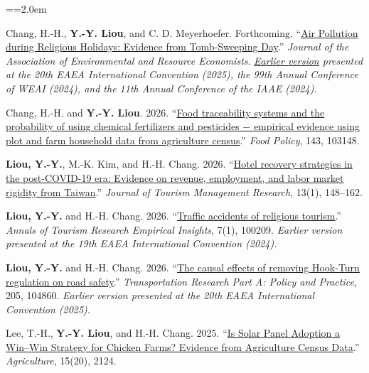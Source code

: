 \documentclass[11pt,letterpaper]{article}
\newenvironment{hanglist}{\par\setlength{\parindent}{0pt}\everypar={\hangindent=2.0em\hangafter=1}}{\par}
\begin{document}
\begin{hanglist}

Chang, H.-H., \textbf{Y.-Y. Liou}, and C. D. Meyerhoefer. Forthcoming. ``\href{https://doi.org/10.1086/743452}{Air Pollution during Religious Holidays: Evidence from Tomb-Sweeping Day}.'' \emph{Journal of the Association of Environmental and Resource Economists}. \newline \textit{\href{https://ssrn.com/abstract=4984614}{Earlier version} presented at the 20th EAEA International Convention (2025), the 99th Annual Conference of WEAI (2024), and the 11th Annual Conference of the IAAE (2024).}

Chang, H.-H. and \textbf{Y.-Y. Liou}. 2026. ``\href{https://doi.org/10.1016/j.foodpol.2026.103148}{Food traceability systems and the probability of using chemical fertilizers and pesticides − empirical evidence using plot and farm household data from agriculture census}.'' \emph{Food Policy}, 143, 103148.

\textbf{Liou, Y.-Y.}, M.-K. Kim, and H.-H. Chang. 2026. ``\href{https://archive.conscientiabeam.com/index.php/31/article/view/4940}{Hotel recovery strategies in the post-COVID-19 era: Evidence on revenue, employment, and labor market rigidity from Taiwan}.'' \emph{Journal of Tourism Management Research}, 13(1), 148--162.

\textbf{Liou, Y.-Y.} and H.-H. Chang. 2026. ``\href{https://doi.org/10.1016/j.annale.2026.100209}{Traffic accidents of religious tourism}.'' \emph{Annals of Tourism Research Empirical Insights}, 7(1), 100209. \newline \textit{Earlier version presented at the 19th EAEA International Convention (2024).}

\textbf{Liou, Y.-Y.} and H.-H. Chang. 2026. ``\href{https://doi.org/10.1016/j.tra.2026.104860}{The causal effects of removing Hook-Turn regulation on road safety}.'' \emph{Transportation Research Part A: Policy and Practice}, 205, 104860. \newline \textit{Earlier version presented at the 20th EAEA International Convention (2025).}

Lee, T.-H., \textbf{Y.-Y. Liou}, and H.-H. Chang. 2025. ``\href{https://www.mdpi.com/2077-0472/15/20/2124}{Is Solar Panel Adoption a Win--Win Strategy for Chicken Farms? Evidence from Agriculture Census Data}.'' \emph{Agriculture}, 15(20), 2124.


\end{hanglist}
\end{document}
